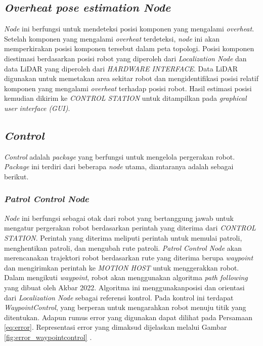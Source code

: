 \subsection{\emph{Overheat pose estimation Node}}
\emph{Node} ini berfungsi untuk mendeteksi posisi komponen yang mengalami \emph{overheat}. Setelah komponen yang mengalami \emph{overheat} terdeteksi, \emph{node} ini akan memperkirakan posisi komponen tersebut dalam peta topologi. Posisi komponen diestimasi berdasarkan posisi robot yang diperoleh dari \emph{Localization Node} dan data LiDAR yang diperoleh dari \emph{HARDWARE INTERFACE}. Data LiDAR digunakan untuk memetakan area sekitar robot dan mengidentifikasi posisi relatif komponen yang mengalami \emph{overheat} terhadap posisi robot. Hasil estimasi posisi kemudian dikirim ke \emph{CONTROL STATION} untuk ditampilkan pada \emph{graphical user interface (GUI)}.

\subsection{\emph{Control}}
\emph{Control} adalah \emph{package} yang berfungsi untuk mengelola pergerakan robot. \emph{Package} ini terdiri dari beberapa \emph{node} utama, diantaranya adalah sebagai berikut.

\subsubsection{\emph{Patrol Control Node}}

\emph{Node} ini berfungsi sebagai otak
 dari robot yang bertanggung jawab untuk mengatur pergerakan robot berdasarkan perintah yang diterima dari \emph{CONTROL STATION}. Perintah yang diterima meliputi perintah untuk memulai patroli, menghentikan patroli, dan mengubah rute patroli. \emph{Patrol Control Node} akan merencanakan trajektori robot berdasarkan rute yang diterima berupa \emph{waypoint} dan mengirimkan perintah ke \emph{MOTION HOST} untuk menggerakkan robot. Dalam mengikuti \emph{waypoint}, robot akan menggunakan algoritma \emph{path following} yang dibuat oleh Akbar 2022. Algoritma ini menggunakanposisi dan orientasi dari \emph{Localization Node} sebagai referensi kontrol. Pada kontrol ini terdapat \emph{WaypointControl}, yang berperan untuk mengarahkan robot menuju titik yang ditentukan. Adapun rumus error yang digunakan dapat dilihat pada Persamaan \ref{eq:error}. Representasi error yang dimaksud dijelaskan melalui Gambar \ref{fig:error_waypointcontrol} \cite{zidan2022}.

